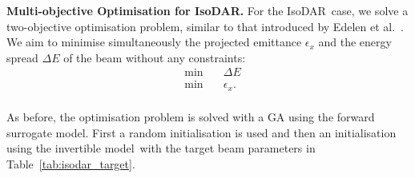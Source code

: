 \documentclass[a4paper, 12pt, version-1-compatibility]{article}
\def\invertiblemodel{invertible model}
\def\isodar{IsoDAR}
\newcommand{\tabref}[1]{Table~\ref{#1}}
\begin{document}


{\bf Multi-objective Optimisation for \isodar.}
For the \isodar\ case, we solve a two-objective optimisation problem, similar to that introduced by Edelen et al.~\cite{ml_speedup}. We aim to minimise simultaneously the projected  emittance $\epsilon_x$ and the energy spread $\Delta E$ of the beam without any constraints:
\begin{equation*}
    \begin{aligned}
        &\text{min} \quad & \Delta E\\
        &\text{min} \quad & \epsilon_x.\\
    \end{aligned}
\end{equation*}

As before, the optimisation problem is solved with a GA using the forward surrogate model. First a random initialisation is used and then an initialisation using the \invertiblemodel\ with the target beam parameters in \tabref{tab:isodar_target}. 

\end{document}
